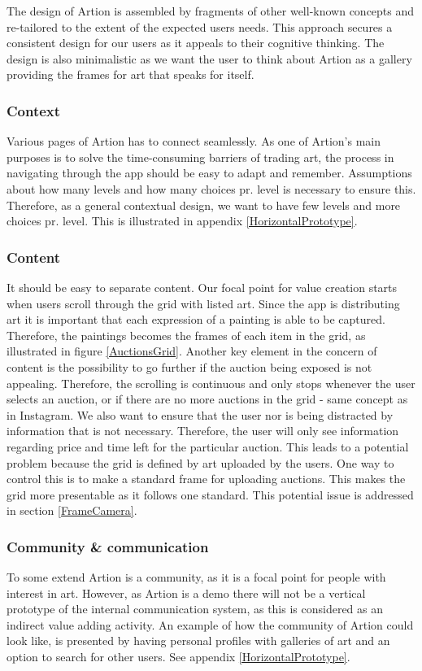 The design of Artion is assembled by fragments of other well-known concepts and re-tailored to the extent of the expected users needs. This approach secures a consistent design for our users as it appeals to their cognitive thinking. The design is also minimalistic as we want the user to think about Artion as a gallery providing the frames for art that speaks for itself.
\subsubsection*{Context}
Various pages of Artion has to connect seamlessly. As one of Artion’s main purposes is to solve the time-consuming barriers of trading art, the process in navigating through the app should be easy to adapt and remember. Assumptions about how many levels and how many choices pr. level is necessary to ensure this. Therefore, as a general contextual design, we want to have few levels and more choices pr. level. This is illustrated in appendix \ref{HorizontalPrototype}.
\subsubsection*{Content}
It should be easy to separate content. Our focal point for value creation starts when users scroll through the grid with listed art. Since the app is distributing art it is important that each expression of a painting is able to be captured. Therefore, the paintings becomes the frames of each item in the grid, as illustrated in figure \ref{AuctionsGrid}. Another key element in the concern of content is the possibility to go further if the auction being exposed is not appealing. Therefore, the scrolling is continuous and only stops whenever the user selects an auction, or if there are no more auctions in the grid - same concept as in Instagram. We also want to ensure that the user nor is being distracted by information that is not necessary. Therefore, the user will only see information regarding price and time left for the particular auction. This leads to a potential problem because the grid is defined by art uploaded by the users. One way to control this is to make a standard frame for uploading auctions. This makes the grid more presentable as it follows one standard. This potential issue is addressed in section \ref{FrameCamera}.
\subsubsection*{Community \& communication}
To some extend Artion is a community, as it is a focal point for people with interest in art. However, as Artion is a demo there will not be a vertical prototype of the internal communication system, as this is considered as an indirect value adding activity. An example of how the community of Artion could look like, is presented by having personal profiles with galleries of art and an option to search for other users. See appendix \ref{HorizontalPrototype}.

